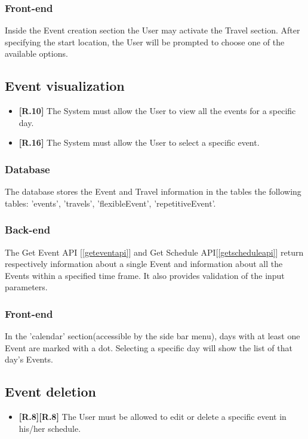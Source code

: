 \subsubsection*{Front-end}
Inside the Event creation section the User may activate the Travel section.
After specifying the start location, the User will be prompted to choose one of the available options.

\subsection{Event visualization}
\begin{itemize}
	\item {\color{OliveGreen}\textbf{[R.10]}} The System must allow the User to view all the events for a specific day.
	\item {\color{OliveGreen}\textbf{[R.16]}} The System must allow the User to select a specific event.
\end{itemize}

\subsubsection*{Database}
The database stores the Event and Travel information in the tables the following tables: 'events', 'travels', 'flexibleEvent', 'repetitiveEvent'.

\subsubsection*{Back-end}
The Get Event API [\ref{geteventapi}] and Get Schedule API[\ref{getscheduleapi}] return respectively information about a single Event and information about all the Events within a specified time frame.
It also provides validation of the input parameters.

\subsubsection*{Front-end}
In the 'calendar' section(accessible by the side bar menu), days with at least one Event are marked with a dot.
Selecting a specific day will show the list of that day's Events.

\subsection{Event deletion}
\begin{itemize}
	\item {\color{OliveGreen}\textbf{[R.8]}}{\color{red}\textbf{[R.8]}} The User must be allowed to edit or delete a specific event in his/her schedule.
\end{itemize}

